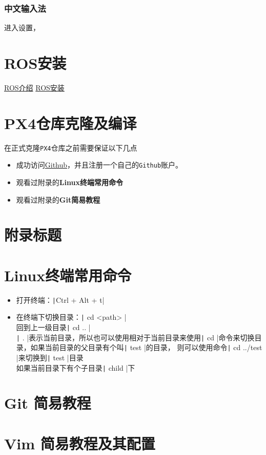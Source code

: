 \documentclass[UTF8]{article}
\begin{document}
\subsubsection{中文输入法}
进入设置，
\section{ROS安装}

\href{URLhttps://wiki.ros.org/ROS/Introduction}{ROS介绍}
\href{https://wiki.ros.org/noetic/Installation/Ubuntu}{ROS安装}

\section{PX4仓库克隆及编译}
在正式克隆\texttt{PX4}仓库之前需要保证以下几点
\begin{itemize}
    \item 成功访问\href{URLhttps://github.com/}{Github}，并且注册一个自己的\texttt{Github}账户。
    \item 观看过附录的\textbf{Linux终端常用命令}
    \item 观看过附录的\textbf{Git简易教程}
\end{itemize}
\begin{appendices}
    \renewcommand{\thesection}{\Alph{section}}
    \section{附录标题}
    \section{Linux终端常用命令}
    \begin{itemize}
        \item 打开终端：\texttt|Ctrl + Alt + t|
        \item 在终端下切换目录：\texttt| cd <path> |\\
              回到上一级目录\texttt| cd .. |\\
              \texttt| . |表示当前目录，所以也可以使用相对于当前目录来使用\texttt| cd |命令来切换目录，如果当前目录的父目录有个叫\texttt| test |的目录，
              则可以使用命令\texttt| cd ../test |来切换到\texttt| test |目录\\
              如果当前目录下有个子目录\texttt| child |下
    \end{itemize}
    \section{Git 简易教程}
    \section{Vim 简易教程及其配置}
\end{appendices}
\end{document}
